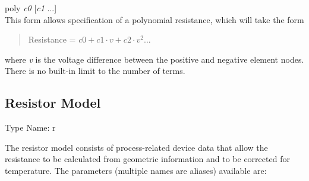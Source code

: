 \begin{description}
\item{\vt poly} {\it c0} [{\it c1} ...]\\
This form allows specification of a polynomial resistance, which will
take the form
\begin{quote}
Resistance = $c0 + c1{\cdot}v + c2{\cdot}v^2 ...$
\end{quote}
where {\it v} is the voltage difference between the positive and
negative element nodes.  There is no built-in limit to the number of
terms.
\end{description}


\subsection{Resistor Model}
\label{resmodel}


{\cb Type Name:} {\vt r}

The resistor model consists of process-related device data that allow
the resistance to be calculated from geometric information and to be
corrected for temperature.  The parameters (multiple names are aliases)
available are:

